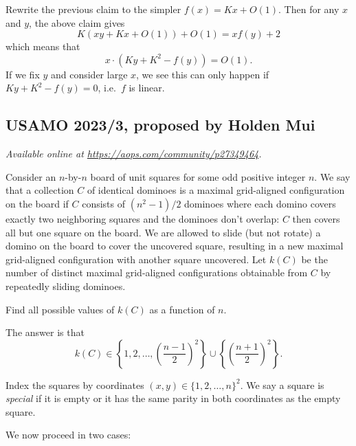 \documentclass[11pt]{scrartcl}
\begin{document}
Rewrite the previous claim to the simpler $f(x) = Kx+O(1)$.
Then for any $x$ and $y$, the above claim gives
\[ K\left( xy + Kx + O(1) \right) + O(1) = x f(y) + 2 \]
which means that
\[ x \cdot \left( Ky + K^2 - f(y) \right) = O(1). \]
If we fix $y$ and consider large $x$,
we see this can only happen if $Ky+K^2-f(y)=0$, i.e.\ $f$ is linear.
\pagebreak

\subsection{USAMO 2023/3, proposed by Holden Mui}
\textsl{Available online at \url{https://aops.com/community/p27349464}.}
\begin{mdframed}[style=mdpurplebox,frametitle={Problem statement}]
Consider an $n$-by-$n$ board of unit squares for some odd positive integer $n$.
We say that a collection $C$ of identical dominoes is a
maximal grid-aligned configuration on the board if $C$ consists of $(n^2-1)/2$
dominoes where each domino covers exactly two neighboring squares
and the dominoes don't overlap: $C$ then covers all but one square on the board.
We are allowed to slide (but not rotate) a domino on the board to
cover the uncovered square, resulting in a new maximal grid-aligned configuration
with another square uncovered. Let $k(C)$ be the number of distinct maximal
grid-aligned configurations obtainable from $C$ by repeatedly sliding dominoes.

Find all possible values of $k(C)$ as a function of $n$.
\end{mdframed}
The answer is that
\[ k(C) \in \left\{ 1, 2, \dots, \left( \frac{n-1}{2} \right)^2 \right\}
  \cup \left\{ \left( \frac{n+1}{2} \right)^2 \right\}. \]

Index the squares by coordinates $(x,y) \in \{1,2,\dots,n\}^2$.
We say a square is \emph{special} if it is empty or
it has the same parity in both coordinates as the empty square.

We now proceed in two cases:
\end{document}
